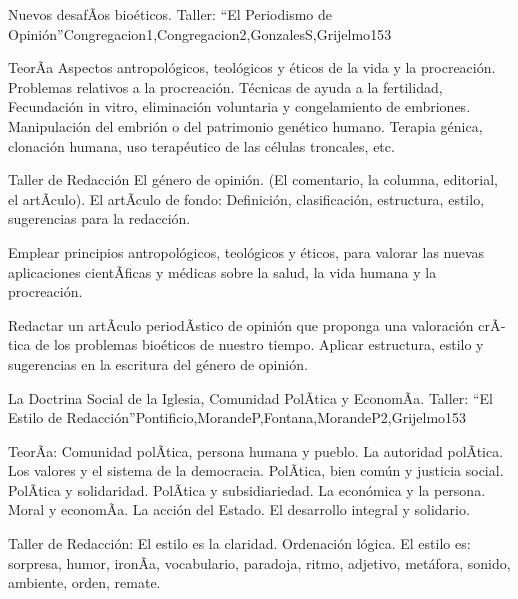 \begin{syllabus}
\begin{unit}{Nuevos desafÃ­os bioéticos. Taller: ``El Periodismo de Opinión''}{Congregacion1,Congregacion2,GonzalesS,Grijelmo}{15}{3}
\begin{topics}
	\item TeorÃ­a
 		\subitem Aspectos antropológicos, teológicos y éticos de la vida y la procreación. 
 		\subitem Problemas relativos a la procreación. Técnicas de ayuda a la fertilidad, Fecundación in vitro, eliminación voluntaria y congelamiento de embriones.
 		\subitem Manipulación del embrión o del patrimonio genético humano. Terapia génica, clonación humana, uso terapéutico de las células troncales, etc.
	\item Taller de Redacción
 		\subitem El género de opinión. (El comentario, la columna, editorial, el artÃ­culo).
 		\subitem El artÃ­culo de fondo: Definición, clasificación, estructura, estilo, sugerencias para la redacción.
\end{topics}
\begin{unitgoals}
	\item Emplear principios antropológicos, teológicos y éticos, para valorar las nuevas aplicaciones cientÃ­ficas y médicas sobre la salud, la vida humana y la procreación.
	\item Redactar un artÃ­culo periodÃ­stico de opinión que proponga una valoración crÃ­tica de los problemas bioéticos de nuestro tiempo. Aplicar estructura, estilo y sugerencias en la escritura del género de opinión.
\end{unitgoals}
\end{unit}

\begin{unit}{La Doctrina Social de la Iglesia, Comunidad PolÃ­tica y EconomÃ­a. Taller: ``El Estilo de Redacción''}{Pontificio,MorandeP,Fontana,MorandeP2,Grijelmo}{15}{3}
\begin{topics}
	\item TeorÃ­a:
 		\subitem Comunidad polÃ­tica, persona humana y pueblo. La autoridad polÃ­tica. Los valores y el sistema de la democracia. PolÃ­tica, bien común y justicia social. PolÃ­tica y solidaridad. PolÃ­tica y subsidiariedad.
 		\subitem La económica y la persona. Moral y economÃ­a. La acción del Estado. El desarrollo integral y solidario.
	\item Taller de Redacción:
 		\subitem El estilo es la claridad. Ordenación lógica. El estilo es: sorpresa, humor, ironÃ­a, vocabulario, paradoja, ritmo, adjetivo, metáfora, sonido, ambiente, orden, remate.


\end{topics}
\end{unit}
\end{syllabus}
